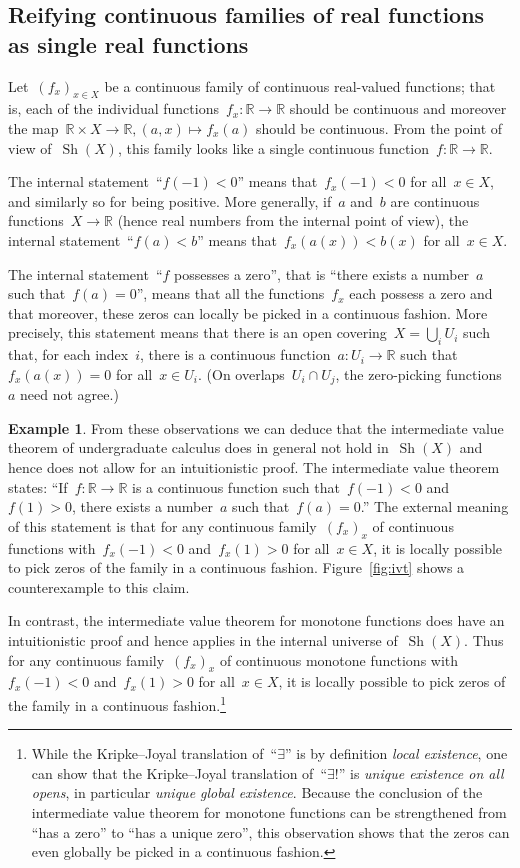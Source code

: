 \documentclass[oneside,reqno]{amsart}
\theoremstyle{definition}
\newtheorem{ex}[defn]{Example}
\theoremstyle{plain}
\theoremstyle{remark}
\newcommand{\RR}{\mathbb{R}}
\DeclareMathOperator{\Sh}{Sh}
\renewcommand{\_}{\mathpunct{.}\,}
\newcommand{\?}{\,{:}\,}
\begin{document}
\subsection{Reifying continuous families of real functions as single real functions}
Let~$(f_x)_{x \in X}$ be a continuous family of
continuous real-valued functions; that is, each of the individual
functions~$f_x : \RR \to \RR$ should be continuous and moreover the map~$\RR
\times X \to \RR, (a,x) \mapsto f_x(a)$ should be continuous.
From the point of view of~$\Sh(X)$, this family looks like a single continuous
function~$f : \RR \to \RR$.

The internal statement~``$f(-1) < 0$'' means that~$f_x(-1) < 0$ for all~$x \in
X$, and similarly so for being positive. More generally, if~$a$ and~$b$ are
continuous functions~$X \to \RR$ (hence real numbers from the internal point of
view), the internal statement~``$f(a) < b$'' means that~$f_x(a(x)) < b(x)$ for
all~$x \in X$.

The internal statement~``$f$ possesses a zero'', that is ``there exists a
number~$a$ such that~$f(a) = 0$'', means that all the functions~$f_x$ each
possess a zero and that moreover, these zeros can locally be picked in a
continuous fashion. More precisely, this statement means that there is an open
covering~$X = \bigcup_i U_i$ such that, for each index~$i$, there is a continuous
function~$a : U_i \to \RR$ such that~$f_x(a(x)) = 0$ for all~$x \in U_i$. (On
overlaps~$U_i \cap U_j$, the zero-picking functions~$a$ need not agree.)

\begin{ex}
From these observations we can deduce that the intermediate value theorem of
undergraduate calculus does in general not hold in~$\Sh(X)$ and hence does not allow
for an intuitionistic proof. The intermediate value theorem states: ``If~$f : \RR \to \RR$
is a continuous function such that~$f(-1) < 0$ and~$f(1) > 0$, there exists a
number~$a$ such that~$f(a) = 0$.'' The external meaning of this statement is
that for any continuous family~$(f_x)_x$ of continuous functions with~$f_x(-1) <
0$ and~$f_x(1) > 0$ for all~$x \in X$, it is locally possible to pick zeros of
the family in a continuous fashion. Figure~\ref{fig:ivt} shows a counterexample
to this claim.

In contrast, the intermediate value theorem for monotone functions does have an
intuitionistic proof and hence applies in the internal universe of~$\Sh(X)$.
Thus for any continuous family~$(f_x)_x$ of continuous monotone functions
with~$f_x(-1) < 0$ and~$f_x(1) > 0$ for all~$x \in X$, it is locally possible
to pick zeros of the family in a continuous fashion.\footnote{While the
Kripke--Joyal translation of~``$\exists$'' is by definition \emph{local
existence}, one can show that the Kripke--Joyal translation of~``$\exists!$''
is \emph{unique existence on all opens}, in particular \emph{unique global
existence}. Because the conclusion of the intermediate value theorem for
monotone functions can be strengthened from ``has a zero'' to ``has a unique
zero'', this observation shows that the zeros can even globally be picked in a
continuous fashion.}
\end{ex}
\end{document}
